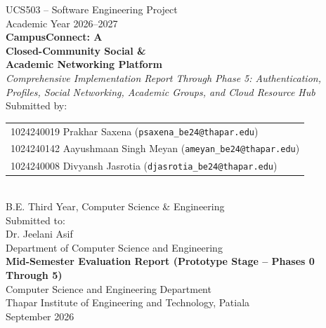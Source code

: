 \documentclass[11pt,a4paper]{report}
\begin{document}
\begin{titlepage}
\centering
\vspace*{1cm}
{\large UCS503 -- Software Engineering Project}\\[2pt]
{\large Academic Year 2026--2027}\\[1.5cm]

{\Huge\bfseries CampusConnect: A}\\[4pt]
{\Huge\bfseries Closed-Community Social \&}\\[4pt]
{\Huge\bfseries Academic Networking Platform}\\[1cm]

{\large\itshape Comprehensive Implementation Report Through Phase 5: Authentication,\\
Profiles, Social Networking, Academic Groups, and Cloud Resource Hub}\\[2cm]

{\large Submitted by:}\\[6pt]
\begin{tabular}{@{}l@{}}
1024240019 \quad Prakhar Saxena \quad (\texttt{psaxena\_be24@thapar.edu})\\
1024240142 \quad Aayushmaan Singh Meyan \quad (\texttt{ameyan\_be24@thapar.edu})\\
1024240008 \quad Divyansh Jasrotia \quad (\texttt{djasrotia\_be24@thapar.edu})
\end{tabular}\\[8pt]
{B.E. Third Year, Computer Science \& Engineering}\\[1.2cm]

{\large Submitted to:}\\[6pt]
{\large Dr. Jeelani Asif}\\
{Department of Computer Science and Engineering}\\[1.5cm]

\vfill
{\bfseries Mid-Semester Evaluation Report (Prototype Stage -- Phases 0 Through 5)}\\[10pt]
Computer Science and Engineering Department\\
Thapar Institute of Engineering and Technology, Patiala\\[4pt]
September 2026
\end{titlepage}

\begingroup
\setlength{\parskip}{0pt}
\linespread{0.95}\selectfont
\tableofcontents
\endgroup
\clearpage
\listoffigures
\clearpage
\listoftables
\clearpage
{}
\end{document}
